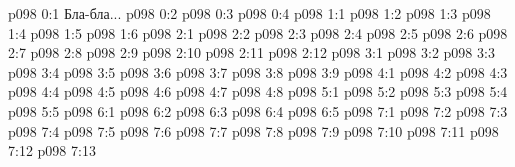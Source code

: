 \author{Мелхиседек}
\vs p098 0:1  Бла-бла...
\vs p098 0:2 
\vs p098 0:3 
\vs p098 0:4 
\vs p098 1:1 
\vs p098 1:2 
\vs p098 1:3 
\vs p098 1:4 
\vs p098 1:5 
\vs p098 1:6 
\vs p098 2:1 
\vs p098 2:2 
\vs p098 2:3 
\vs p098 2:4 \pc 
\vs p098 2:5 
\vs p098 2:6 
\vs p098 2:7 \pc 
\vs p098 2:8 
\vs p098 2:9 
\vs p098 2:10 \pc 
\vs p098 2:11 
\vs p098 2:12 \pc 
{}
\vs p098 3:1 
\vs p098 3:2 
\vs p098 3:3 
\vs p098 3:4 
\vs p098 3:5 
\vs p098 3:6 \pc 
\vs p098 3:7 
\vs p098 3:8 
\vs p098 3:9 \pc 
{}
\vs p098 4:1 
\vs p098 4:2 
\vs p098 4:3 
\vs p098 4:4 
\vs p098 4:5 
\vs p098 4:6 \pc 
\vs p098 4:7 \pc 
\vs p098 4:8 
\vs p098 5:1 
\vs p098 5:2 
\vs p098 5:3 \pc 
\vs p098 5:4 
\vs p098 5:5 
\vs p098 6:1 
\vs p098 6:2 
\vs p098 6:3 \pc 
\vs p098 6:4 
\vs p098 6:5 \pc 
{}
\vs p098 7:1 
\vs p098 7:2 
\vs p098 7:3 
\vs p098 7:4 
\vs p098 7:5 
\vs p098 7:6 
\vs p098 7:7 
\vs p098 7:8 
\vs p098 7:9 
\vs p098 7:10 
\vs p098 7:11 \pc 
\vs p098 7:12 \pc 
\vsetoff
\vs p098 7:13 
\quizlink

